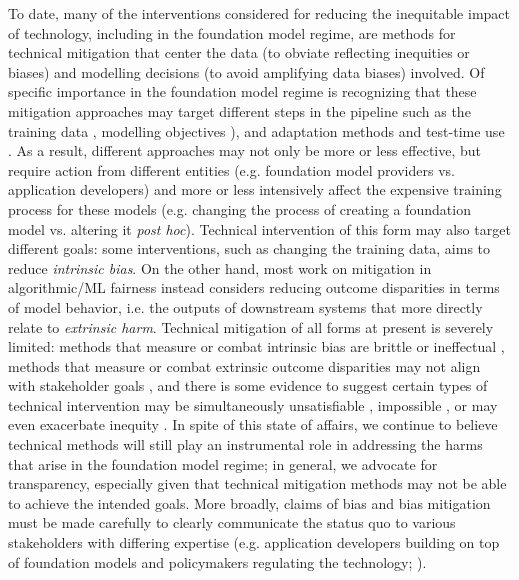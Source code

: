 To date, many of the interventions considered for reducing the inequitable impact of technology, including in the foundation model regime, are methods for technical mitigation that center the data (to obviate reflecting inequities or biases) and modelling decisions (to avoid amplifying data biases) involved. Of specific importance in the foundation model regime is recognizing that these mitigation approaches may target different steps in the pipeline such as the training data \citep[e.g. ][]{lu2020}, modelling objectives \citep[e.g. ][]{zhao2018}), and adaptation methods and test-time use \citep[e.g. ][]{park2018,zhao2019}. As a result, different approaches may not only be more or less effective, but require action from different entities (e.g. foundation model providers vs. application developers) and more or less intensively affect the expensive training process for these models (e.g. changing the process of creating a foundation model vs. altering it \textit{post hoc}). Technical intervention of this form may also target different goals: some interventions, such as changing the training data, aims to reduce \textit{intrinsic bias}. On the other hand, most work on mitigation in algorithmic/ML fairness instead considers reducing outcome disparities in terms of model behavior, i.e. the outputs of downstream systems that more directly relate to \textit{extrinsic harm}. Technical mitigation of all forms at present is severely limited: methods that measure or combat intrinsic bias are brittle or ineffectual \citep{gonen19, ethayarajh2019, bommasani2020, zhou-etal-2021-challenges, Antoniak2021}, methods that measure or combat extrinsic outcome disparities may not align with stakeholder goals \citep{saha2020}, and there is some evidence to suggest certain types of technical intervention may be simultaneously unsatisfiable \citep{CorbettDavies2018, kleinberg2017}, impossible \citep{lechner2021}, or may even exacerbate inequity \citep{xu-etal-2021-detoxifying}. In spite of this state of affairs, we continue to believe technical methods will still play an instrumental role in addressing the harms that arise in the foundation model regime; in general, we advocate for transparency, especially given that technical mitigation methods may not be able to achieve the intended goals. More broadly, claims of bias and bias mitigation must be made carefully to clearly communicate the status quo to various stakeholders with differing expertise (e.g. application developers building on top of foundation models and policymakers regulating the technology; \citep{nissim2020}). 

